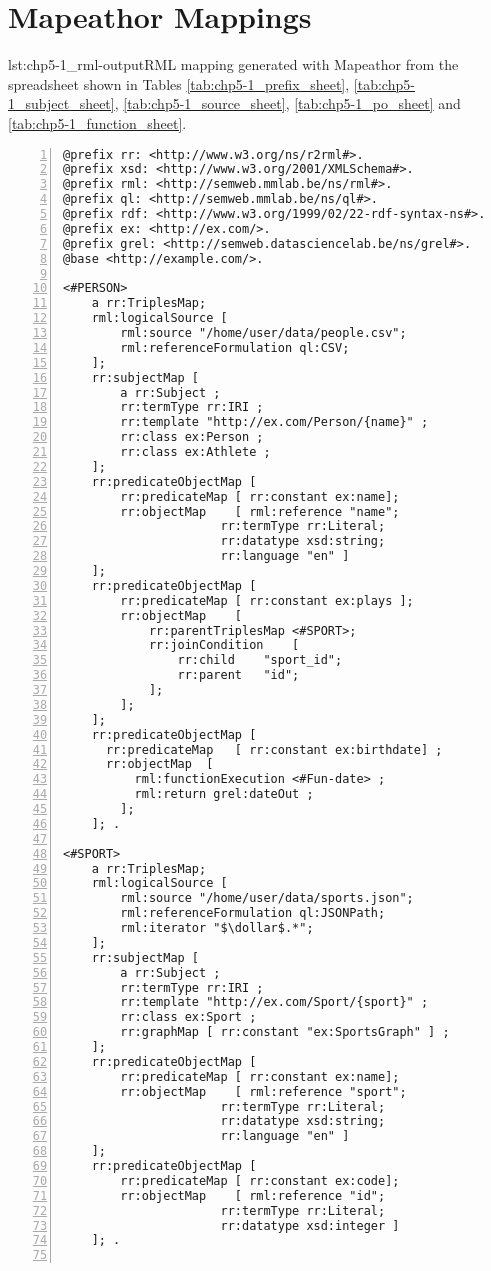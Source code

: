 \chapter{Mapeathor Mappings}
\label{sec:appendix-mapeathor}

\begin{captionedlisting}{lst:chp5-1_rml-output}{RML mapping generated with Mapeathor from the spreadsheet shown in Tables \ref{tab:chp5-1_prefix_sheet}, \ref{tab:chp5-1_subject_sheet}, \ref{tab:chp5-1_source_sheet}, \ref{tab:chp5-1_po_sheet} and \ref{tab:chp5-1_function_sheet}. }
\centering
{\begin{lstlisting}[numbers=left,basicstyle=\ttfamily\small,columns=flexible]
@prefix rr: <http://www.w3.org/ns/r2rml#>.
@prefix xsd: <http://www.w3.org/2001/XMLSchema#>.
@prefix rml: <http://semweb.mmlab.be/ns/rml#>.
@prefix ql: <http://semweb.mmlab.be/ns/ql#>.
@prefix rdf: <http://www.w3.org/1999/02/22-rdf-syntax-ns#>.
@prefix ex: <http://ex.com/>.
@prefix grel: <http://semweb.datasciencelab.be/ns/grel#>.
@base <http://example.com/>.

<#PERSON>
    a rr:TriplesMap;
    rml:logicalSource [
    	rml:source "/home/user/data/people.csv";
    	rml:referenceFormulation ql:CSV;
    ];
    rr:subjectMap [
    	a rr:Subject ;
    	rr:termType rr:IRI ;
    	rr:template "http://ex.com/Person/{name}" ;
    	rr:class ex:Person ;
    	rr:class ex:Athlete ;
    ];
    rr:predicateObjectMap [
    	rr:predicateMap	[ rr:constant ex:name];
    	rr:objectMap	[ rml:reference "name"; 
                      rr:termType rr:Literal;  
                      rr:datatype xsd:string;  
                      rr:language "en" ]
    ];
    rr:predicateObjectMap [
    	rr:predicateMap	[ rr:constant ex:plays ];
    	rr:objectMap	[
    		rr:parentTriplesMap	<#SPORT>;
    		rr:joinCondition	[
    			rr:child	"sport_id";
    			rr:parent	"id";
    		];
    	];
    ];
    rr:predicateObjectMap [
      rr:predicateMap	[ rr:constant ex:birthdate] ;
      rr:objectMap	[
    	  rml:functionExecution <#Fun-date> ;
    	  rml:return grel:dateOut ;
    	];
    ]; .

<#SPORT>
    a rr:TriplesMap;
    rml:logicalSource [
    	rml:source "/home/user/data/sports.json";
    	rml:referenceFormulation ql:JSONPath;
        rml:iterator "$\dollar$.*";
    ];
    rr:subjectMap [
    	a rr:Subject ;
    	rr:termType rr:IRI ;
    	rr:template "http://ex.com/Sport/{sport}" ;
    	rr:class ex:Sport ;
    	rr:graphMap [ rr:constant "ex:SportsGraph" ] ;
    ];
    rr:predicateObjectMap [
    	rr:predicateMap	[ rr:constant ex:name];
    	rr:objectMap	[ rml:reference "sport";  
                      rr:termType rr:Literal;  
                      rr:datatype xsd:string;  
                      rr:language "en" ]
    ];
    rr:predicateObjectMap [
    	rr:predicateMap	[ rr:constant ex:code];
    	rr:objectMap	[ rml:reference "id";  
                      rr:termType rr:Literal;  
                      rr:datatype xsd:integer ]
    ]; .


\end{lstlisting}}
\end{captionedlisting}

